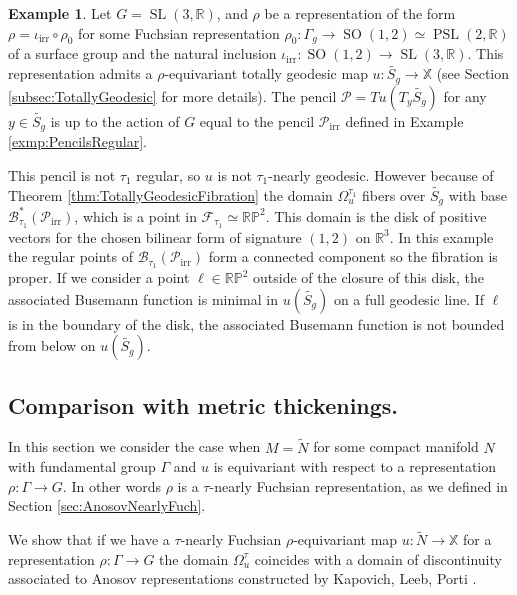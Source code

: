 \documentclass[reqno,10pt]{amsart}
\theoremstyle{plain}
\theoremstyle{definition}
\newtheorem{exmp}[thm]{Example}
\theoremstyle{remark}
\newcommand{\type}{\tau}
\newcommand{\R}{\mathbb{R}}
\DeclareMathOperator{\PSL}{PSL}
\DeclareMathOperator{\SL}{SL}
\DeclareMathOperator{\SO}{SO}
\newcommand{\X}{\mathbb{X}}
\begin{document}
\begin{exmp}
\label{exmp:Nonregular}
Let $G=\SL(3,\R)$, and $\rho$ be a representation of the form $\rho=\iota_\text{irr}\circ \rho_0$ for some Fuchsian representation $\rho_0:\Gamma_g\to \SO(1,2)\simeq \PSL(2,\R)$ of a surface group and the natural inclusion $\iota_\text{irr}:\SO(1,2)\to \SL(3,\R)$. This representation admits a $\rho$-equivariant totally geodesic map $u:\widetilde{S_g}\to \X$ (see Section \ref{subsec:TotallyGeodesic} for more details). The pencil $\mathcal{P}=Tu(T_y\widetilde{S_g})$ for any $y\in \widetilde{S_g}$ is up to the action of $G$ equal to the pencil $\mathcal{P}_\text{irr}$ defined in Example \ref{exmp:PencilsRegular}.

\medskip

This pencil is not $\type_1$ regular, so $u$ is not $\type_1$-nearly geodesic. However because of Theorem \ref{thm:TotallyGeodesicFibration} the domain $\Omega_u^{\type_1}$ fibers over $\widetilde{S_g}$ with base $\mathcal{B}^*_{\type_1}(\mathcal{P}_\text{irr})$, which is a point in $\mathcal{F}_{\type_1}\simeq \mathbb{RP}^2$. This domain is the disk of positive vectors for the chosen bilinear form of signature $(1,2)$ on $\R^3$. In this example the regular points of $\mathcal{B}_{\type_1}(\mathcal{P}_\text{irr})$ form a connected component so the fibration is proper. If we consider a point $\ell\in \mathbb{RP}^2$ outside of the closure of this disk, the associated Busemann function is minimal in $u(\tilde{S_g})$ on a full geodesic line. If $\ell$ is in the boundary of the disk, the associated Busemann function is not bounded from below on $u(\tilde{S_g})$.

\end{exmp}

\subsection{Comparison with metric thickenings.}
\label{subsec:DoDKLP}
In this section we consider the case when $M=\widetilde{N}$ for some compact manifold $N$ with fundamental group $\Gamma$ and $u$ is equivariant with respect to a representation $\rho:\Gamma\to G$. In other words $\rho$ is a $\type$-nearly Fuchsian representation, as we defined in Section \ref{sec:AnosovNearlyFuch}. 

\medskip

 We show that if we have a $\type$-nearly Fuchsian $\rho$-equivariant map $u:\widetilde{N}\to \X$ for a representation $\rho:\Gamma\to G$ the domain $\Omega_u^\type$ coincides with a domain of discontinuity associated to Anosov representations constructed by Kapovich, Leeb, Porti \cite{KLP-DoD}.
\end{document}
